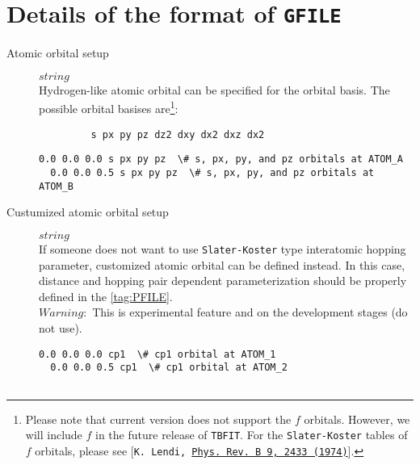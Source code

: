 \documentclass[a4paper,12pt]{scrartcl}
\makeatletter
\def\namedlabel#1#2{\begingroup
    #2%
    \def\@currentlabel{#2}%
    \phantomsection\label{#1}\endgroup
}
\newcommand{\tbfitname}{\textcolor{blue!85!white}{\texttt{TBFIT}}}
\makeatother
\begin{document}
\section{Details of the format of \texttt{GFILE}}\label{tag:GFILE-detail}
\begin{description}

    \item[\namedlabel{tag:ATOMICORB}{Atomic orbital setup}] $string$ \\
        Hydrogen-like atomic orbital can be specified for the orbital basis.
        The possible orbital basises are\footnote{Please note that current 
		version does not support the $f$ orbitals.
        However, we will include $f$ in the future release of \tbfitname{}. 
		For the \texttt{Slater-Koster} tables of $f$ orbitals, please see
		[\texttt{K. Lendi, 
		\href{https://journals.aps.org/prb/abstract/10.1103/PhysRevB.9.2433}
		{Phys. Rev. B 9, 2433 (1974)}}].}:
        \begin{verbatim}
         s px py pz dz2 dxy dx2 dxz dx2
        \end{verbatim}


\begin{Verbatim}[commandchars=\\\{\},gobble=4, frame=single, framesep=2mm, 
    label= setup of atomic orbital basis in \ref{tag:GFILE},
    labelposition=bottomline]
  0.0 0.0 0.0 s px py pz  \# s, px, py, and pz orbitals at ATOM_A
  0.0 0.0 0.5 s px py pz  \# s, px, py, and pz orbitals at ATOM_B

\end{Verbatim}

    \item[\namedlabel{tag:CUSTOM}{Custumized atomic orbital setup}] $string$ \\
        If someone does not want to use \texttt{Slater-Koster} type interatomic
        hopping parameter, customized atomic orbital can be defined instead.
        In this case, distance and hopping pair dependent parameterization
        should be properly defined in the \ref{tag:PFILE}. \\
        $Warning:$ This is experimental feature and on the development stages (do not use).
        

\begin{Verbatim}[commandchars=\\\{\},gobble=4, frame=single, framesep=2mm, 
    label= setup of custumized atomic orbital name $cp1$,
    labelposition=bottomline]
  0.0 0.0 0.0 cp1  \# cp1 orbital at ATOM_1
  0.0 0.0 0.5 cp1  \# cp1 orbital at ATOM_2


\end{Verbatim}
\end{description}
\end{document}
